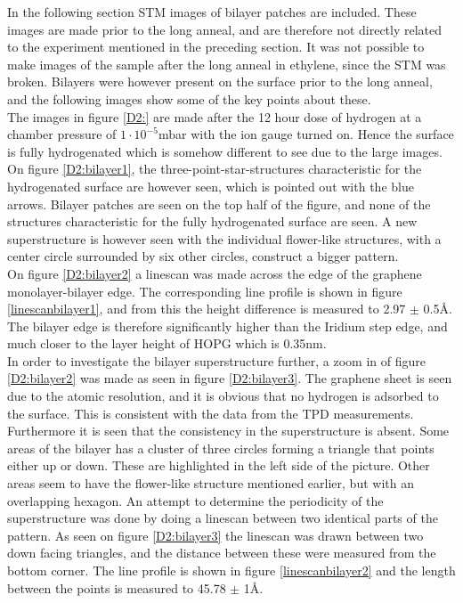 In the following section STM images of bilayer patches are included. These images are made prior to the long anneal, and are therefore not directly related to the experiment mentioned in the preceding section. It was not possible to make images of the sample after the long anneal in ethylene, since the STM was broken. Bilayers were however present on the surface prior to the long anneal, and the following images show some of the key points about these.\\
The images in figure \ref{D2:} are made after the 12 hour dose of hydrogen at a chamber pressure of $1\cdot 10^{-5}$mbar with the ion gauge turned on. Hence the surface is fully hydrogenated which is somehow different to see due to the large images. On figure \ref{D2:bilayer1}, the three-point-star-structures characteristic for the hydrogenated surface are however seen, which is pointed out with the blue arrows. Bilayer patches are seen on the top half of the figure, and none of the structures characteristic for the fully hydrogenated surface are seen. A new superstructure is however seen with the individual flower-like structures, with a center circle surrounded by six other circles, construct a bigger pattern.\\
On figure \ref{D2:bilayer2} a linescan was made across the edge of the graphene monolayer-bilayer edge. The corresponding line profile is shown in figure \ref{linescanbilayer1}, and from this the height difference is measured to 2.97 $\pm$ 0.5Å. The bilayer edge is therefore significantly higher than the Iridium step edge, and much closer to the layer height of HOPG which is 0.35nm.\cite{PhysRevB.79.195429}\\
In order to investigate the bilayer superstructure further, a zoom in of figure \ref{D2:bilayer2} was made as seen in figure \ref{D2:bilayer3}. The graphene sheet is seen due to the atomic resolution, and it is obvious that no hydrogen is adsorbed to the surface. This is consistent with the data from the TPD measurements. Furthermore it is seen that the consistency in the superstructure is absent. Some areas of the bilayer has a cluster of three circles forming a triangle that points either up or down. These are highlighted in the left side of the picture. Other areas seem to have the flower-like structure mentioned earlier, but with an overlapping hexagon. An attempt to determine the periodicity of the superstructure was done by doing a linescan between two identical parts of the pattern. As seen on figure \ref{D2:bilayer3} the linescan was drawn between two down facing triangles, and the distance between these were measured from the bottom corner. The line profile is shown in figure \ref{linescanbilayer2} and the length between the points is measured to 45.78 $\pm$ 1Å.

